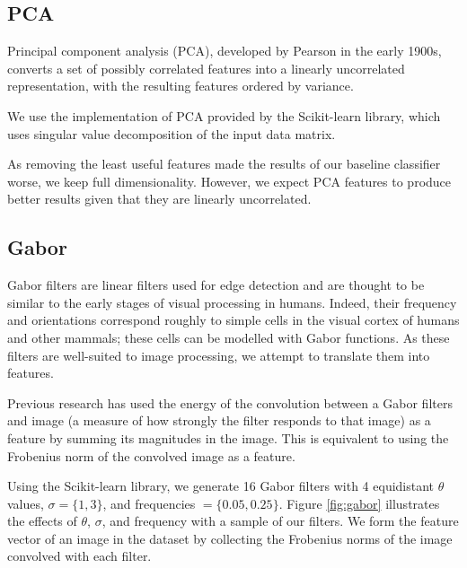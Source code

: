 \documentclass{acm_proc_article-sp}
\begin{document}
\subsection{PCA}
Principal component analysis (PCA), developed by Pearson in the early 1900s\cite{Pearson}, converts a set of possibly correlated features into a linearly uncorrelated representation, with the resulting features ordered by variance. 

We use the implementation of PCA provided by the Scikit-learn library\cite{scikit-learn}, which uses singular value decomposition of the input data matrix.

As removing the least useful features made the results of our baseline classifier worse, we keep full dimensionality. However, we expect PCA features to produce better results given that they are linearly uncorrelated.

\subsection{Gabor}
Gabor filters are linear filters used for edge detection and are thought to be similar to the early stages of visual processing in humans. Indeed, their frequency and orientations correspond roughly to simple cells in the visual cortex of humans and other mammals; these cells can be modelled with Gabor functions.\cite{Jones}\cite{Marvcelja} As these filters are well-suited to image processing, we attempt to translate them into features.

Previous research has used the energy of the convolution between a Gabor filters and image (a measure of how strongly the filter responds to that image\cite{Grigorescu}) as a feature by summing its magnitudes in the image.\cite{Bau} This is equivalent to using the Frobenius norm of the convolved image as a feature. 

Using the Scikit-learn library\cite{scikit-learn}, we generate 16 Gabor filters with 4 equidistant $\theta$ values, $\sigma = \{1, 3\}$, and frequencies $= \{0.05, 0.25\}$. Figure \ref{fig:gabor} illustrates the effects of $\theta$, $\sigma$, and frequency with a sample of our filters. We form the feature vector of an image in the dataset by collecting the Frobenius norms of the image convolved with each filter. 
\end{document}

